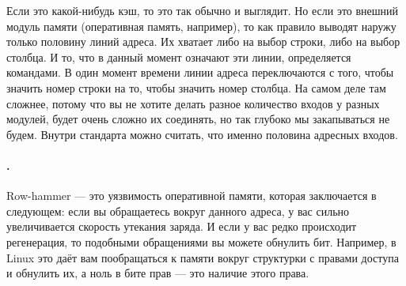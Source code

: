 \documentclass{article}
\begin{document}
    \begin{center}
    \end{center}
    Если это какой-нибудь кэш, то это так обычно и выглядит. Но если это внешний модуль памяти (оперативная память, например), то как правило выводят наружу только половину линий адреса. Их хватает либо на выбор строки, либо на выбор столбца. И то, что в данный момент означают эти линии, определяется командами. В один момент времени линии адреса переключаются с того, чтобы значить номер строки на то, чтобы значить номер столбца. На самом деле там сложнее, потому что вы не хотите делать разное количество входов у разных модулей, будет очень сложно их соединять, но так глубоко мы закапываться не будем. Внутри стандарта можно считать, что именно половина адресных входов.
    \paragraph{.}
    Row-hammer --- это уязвимость оперативной памяти, которая заключается в следующем: если вы обращаетесь вокруг данного адреса, у вас сильно увеличивается скорость утекания заряда. И если у вас редко происходит регенерация, то подобными обращениями вы можете обнулить бит. Например, в Linux это даёт вам пообращаться к памяти вокруг структурки с правами доступа и обнулить их, а ноль в бите прав --- это наличие этого права.
\end{document}
